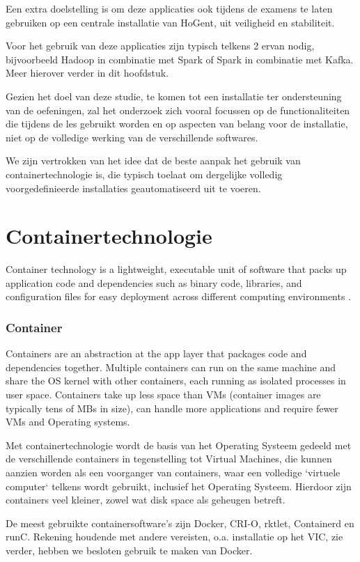 Een extra doelstelling is om deze applicaties ook tijdens de examens te laten gebruiken op een centrale installatie van HoGent, uit veiligheid en stabiliteit.

Voor het gebruik van deze applicaties zijn typisch telkens 2 ervan nodig, bijvoorbeeld Hadoop in combinatie met Spark of Spark in combinatie met Kafka. Meer hierover verder in dit hoofdstuk.

Gezien het doel van deze studie, te komen tot een installatie ter ondersteuning van de oefeningen, zal het onderzoek zich vooral focussen op de functionaliteiten die tijdens de les gebruikt worden en op aspecten van belang voor de installatie, niet op de volledige werking van de verschillende softwares.

We zijn vertrokken van het idee dat de beste aanpak het gebruik van containertechnologie is, die typisch toelaat om dergelijke volledig voorgedefinieerde installaties geautomatiseerd uit te voeren.

\section{Containertechnologie}
Container technology is a lightweight, executable unit of software that packs up application code and dependencies such as binary code, libraries, and configuration files for easy deployment across different computing environments \autocite{Solarwinds2023}.

\subsubsection{Container}
Containers are an abstraction at the app layer that packages code and dependencies together. Multiple containers can run on the same machine and share the OS kernel with other containers, each running as isolated processes in user space. Containers take up less space than VMs (container images are typically tens of MBs in size), can handle more applications and require fewer VMs and Operating systems.\autocite{Docker2023a}

Met containertechnologie wordt de basis van het Operating Systeem gedeeld met de verschillende containers in tegenstelling tot Virtual Machines, die kunnen aanzien worden als een voorganger van containers, waar een volledige `virtuele computer` telkens wordt gebruikt, inclusief het Operating Systeem. Hierdoor zijn containers veel kleiner, zowel wat disk space als geheugen betreft.

De meest gebruikte containersoftware's zijn Docker, CRI-O, rktlet, Containerd en runC. Rekening houdende met andere vereisten, o.a. installatie op het VIC, zie verder, hebben we besloten gebruik te maken van Docker.

